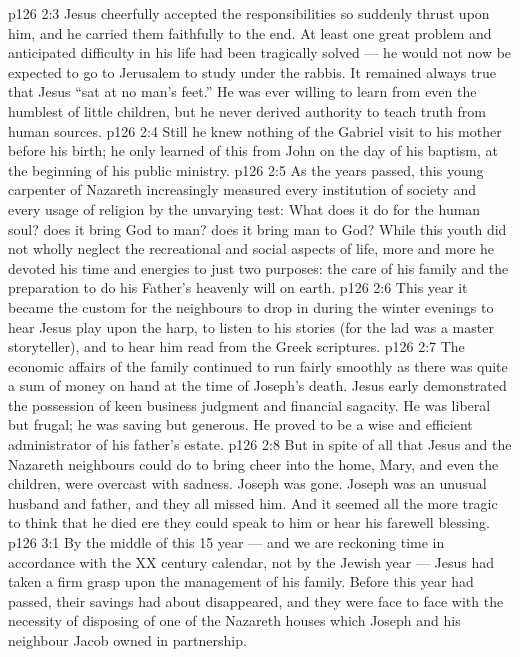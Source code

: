 \vs p126 2:3 Jesus cheerfully accepted the responsibilities so suddenly thrust upon him, and he carried them faithfully to the end. At least one great problem and anticipated difficulty in his life had been tragically solved --- he would not now be expected to go to Jerusalem to study under the rabbis. It remained always true that Jesus “sat at no man’s feet.” He was ever willing to learn from even the humblest of little children, but he never derived authority to teach truth from human sources.
\vs p126 2:4 Still he knew nothing of the Gabriel visit to his mother before his birth; he only learned of this from John on the day of his baptism, at the beginning of his public ministry.
\vs p126 2:5 \pc As the years passed, this young carpenter of Nazareth increasingly measured every institution of society and every usage of religion by the unvarying test: What does it do for the human soul? does it bring God to man? does it bring man to God? While this youth did not wholly neglect the recreational and social aspects of life, more and more he devoted his time and energies to just two purposes: the care of his family and the preparation to do his Father’s heavenly will on earth.
\vs p126 2:6 \pc This year it became the custom for the neighbours to drop in during the winter evenings to hear Jesus play upon the harp, to listen to his stories (for the lad was a master storyteller), and to hear him read from the Greek scriptures.
\vs p126 2:7 The economic affairs of the family continued to run fairly smoothly as there was quite a sum of money on hand at the time of Joseph’s death. Jesus early demonstrated the possession of keen business judgment and financial sagacity. He was liberal but frugal; he was saving but generous. He proved to be a wise and efficient administrator of his father’s estate.
\vs p126 2:8 But in spite of all that Jesus and the Nazareth neighbours could do to bring cheer into the home, Mary, and even the children, were overcast with sadness. Joseph was gone. Joseph was an unusual husband and father, and they all missed him. And it seemed all the more tragic to think that he died ere they could speak to him or hear his farewell blessing.
\vs p126 3:1 By the middle of this 15 year --- and we are reckoning time in accordance with the XX century calendar, not by the Jewish year --- Jesus had taken a firm grasp upon the management of his family. Before this year had passed, their savings had about disappeared, and they were face to face with the necessity of disposing of one of the Nazareth houses which Joseph and his neighbour Jacob owned in partnership.
